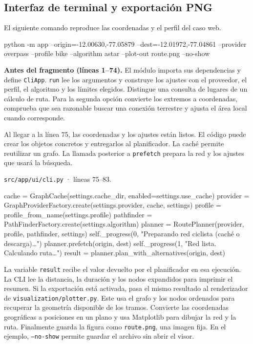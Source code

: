 \documentclass[11pt,a4paper]{article}
\begin{document}
\subsection{Interfaz de terminal y exportación PNG}
El siguiente comando reproduce las coordenadas y el perfil del caso web.

\begin{Codigo}[numbers=none]
python -m app --origin=-12.00630,-77.05879 --dest=-12.01972,-77.04861 --provider overpass --profile bike --algorithm astar --plot-out route.png --no-show
\end{Codigo}

\textbf{Antes del fragmento (líneas 1--74).} El módulo importa sus dependencias y define \texttt{CliApp}. \texttt{run} lee los argumentos y construye los ajustes con el proveedor, el perfil, el algoritmo y los límites elegidos. Distingue una consulta de lugares de un cálculo de ruta. Para la segunda opción convierte los extremos a coordenadas, comprueba que sea razonable buscar una conexión terrestre y ajusta el área local cuando corresponde.

Al llegar a la línea 75, las coordenadas y los ajustes están listos. El código puede crear los objetos concretos y entregarlos al planificador. La caché permite reutilizar un grafo. La llamada posterior a \texttt{prefetch} prepara la red y los ajustes que usará la búsqueda.

\par\medskip
\noindent\begin{minipage}{\linewidth}
{\footnotesize\nolinkurl{src/app/ui/cli.py} · líneas 75--83.\par}
\nopagebreak[4]
\begin{Codigo}[firstnumber=75]
            cache = GraphCache(settings.cache_dir, enabled=settings.use_cache)
            provider = GraphProviderFactory.create(settings.provider, cache, settings)
            profile = profile_from_name(settings.profile)
            pathfinder = PathFinderFactory.create(settings.algorithm)
            planner = RoutePlanner(provider, profile, pathfinder, settings)
            self._progress(0, "Preparando red ciclista (caché o descarga)…")
            planner.prefetch(origin, dest)
            self._progress(1, "Red lista. Calculando ruta…")
            result = planner.plan_with_alternatives(origin, dest)
\end{Codigo}
\end{minipage}\par

La variable \texttt{result} recibe el valor devuelto por el planificador en esa ejecución. La CLI lee la distancia, la duración y los nodos expandidos para imprimir el resumen. Si la exportación está activada, pasa el mismo resultado al renderizador de \texttt{visualization/plotter.py}. Este usa el grafo y los nodos ordenados para recuperar la geometría disponible de los tramos. Convierte las coordenadas geográficas a posiciones en un plano y usa Matplotlib para dibujar la red y la ruta. Finalmente guarda la figura como \texttt{route.png}, una imagen fija. En el ejemplo, \texttt{--no-show} permite guardar el archivo sin abrir el visor.
\end{document}

